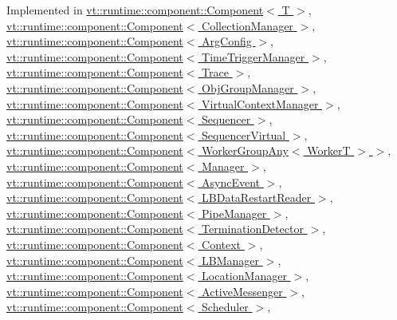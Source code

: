 Implemented in \hyperlink{structvt_1_1runtime_1_1component_1_1_component_adaf8bd995d4c91702e2ff7806ad9e695}{vt\+::runtime\+::component\+::\+Component$<$ T $>$}, \hyperlink{structvt_1_1runtime_1_1component_1_1_component_adaf8bd995d4c91702e2ff7806ad9e695}{vt\+::runtime\+::component\+::\+Component$<$ Collection\+Manager $>$}, \hyperlink{structvt_1_1runtime_1_1component_1_1_component_adaf8bd995d4c91702e2ff7806ad9e695}{vt\+::runtime\+::component\+::\+Component$<$ Arg\+Config $>$}, \hyperlink{structvt_1_1runtime_1_1component_1_1_component_adaf8bd995d4c91702e2ff7806ad9e695}{vt\+::runtime\+::component\+::\+Component$<$ Time\+Trigger\+Manager $>$}, \hyperlink{structvt_1_1runtime_1_1component_1_1_component_adaf8bd995d4c91702e2ff7806ad9e695}{vt\+::runtime\+::component\+::\+Component$<$ Trace $>$}, \hyperlink{structvt_1_1runtime_1_1component_1_1_component_adaf8bd995d4c91702e2ff7806ad9e695}{vt\+::runtime\+::component\+::\+Component$<$ Obj\+Group\+Manager $>$}, \hyperlink{structvt_1_1runtime_1_1component_1_1_component_adaf8bd995d4c91702e2ff7806ad9e695}{vt\+::runtime\+::component\+::\+Component$<$ Virtual\+Context\+Manager $>$}, \hyperlink{structvt_1_1runtime_1_1component_1_1_component_adaf8bd995d4c91702e2ff7806ad9e695}{vt\+::runtime\+::component\+::\+Component$<$ Sequencer $>$}, \hyperlink{structvt_1_1runtime_1_1component_1_1_component_adaf8bd995d4c91702e2ff7806ad9e695}{vt\+::runtime\+::component\+::\+Component$<$ Sequencer\+Virtual $>$}, \hyperlink{structvt_1_1runtime_1_1component_1_1_component_adaf8bd995d4c91702e2ff7806ad9e695}{vt\+::runtime\+::component\+::\+Component$<$ Worker\+Group\+Any$<$ Worker\+T $>$ $>$}, \hyperlink{structvt_1_1runtime_1_1component_1_1_component_adaf8bd995d4c91702e2ff7806ad9e695}{vt\+::runtime\+::component\+::\+Component$<$ Manager $>$}, \hyperlink{structvt_1_1runtime_1_1component_1_1_component_adaf8bd995d4c91702e2ff7806ad9e695}{vt\+::runtime\+::component\+::\+Component$<$ Async\+Event $>$}, \hyperlink{structvt_1_1runtime_1_1component_1_1_component_adaf8bd995d4c91702e2ff7806ad9e695}{vt\+::runtime\+::component\+::\+Component$<$ L\+B\+Data\+Restart\+Reader $>$}, \hyperlink{structvt_1_1runtime_1_1component_1_1_component_adaf8bd995d4c91702e2ff7806ad9e695}{vt\+::runtime\+::component\+::\+Component$<$ Pipe\+Manager $>$}, \hyperlink{structvt_1_1runtime_1_1component_1_1_component_adaf8bd995d4c91702e2ff7806ad9e695}{vt\+::runtime\+::component\+::\+Component$<$ Termination\+Detector $>$}, \hyperlink{structvt_1_1runtime_1_1component_1_1_component_adaf8bd995d4c91702e2ff7806ad9e695}{vt\+::runtime\+::component\+::\+Component$<$ Context $>$}, \hyperlink{structvt_1_1runtime_1_1component_1_1_component_adaf8bd995d4c91702e2ff7806ad9e695}{vt\+::runtime\+::component\+::\+Component$<$ L\+B\+Manager $>$}, \hyperlink{structvt_1_1runtime_1_1component_1_1_component_adaf8bd995d4c91702e2ff7806ad9e695}{vt\+::runtime\+::component\+::\+Component$<$ Location\+Manager $>$}, \hyperlink{structvt_1_1runtime_1_1component_1_1_component_adaf8bd995d4c91702e2ff7806ad9e695}{vt\+::runtime\+::component\+::\+Component$<$ Active\+Messenger $>$}, \hyperlink{structvt_1_1runtime_1_1component_1_1_component_adaf8bd995d4c91702e2ff7806ad9e695}{vt\+::runtime\+::component\+::\+Component$<$ Scheduler $>$}, 
